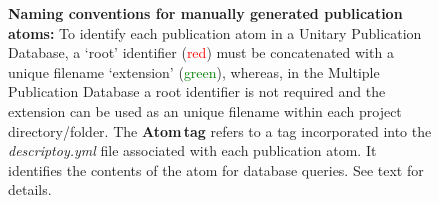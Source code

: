 \documentclass[12pt]{article}
\begin{document}
\begin{figure}[h]
\caption{{\bf Naming conventions for manually generated publication atoms:} To identify each publication atom in a Unitary Publication Database, a `root' identifier ({\textcolor{red}{red}}) must be concatenated with a unique filename `extension' ({\textcolor{green}{green}}), whereas, in the Multiple Publication Database a root identifier is not required and the extension can be used as an unique filename within each project directory/folder. The {\bf Atom\,tag} refers to a tag incorporated into the {\it descriptoy.yml} file associated with each publication atom. It identifies the contents of the atom for database queries. See text for details.}
  \label{fig:po-1}
\end{figure}



\end{document}
